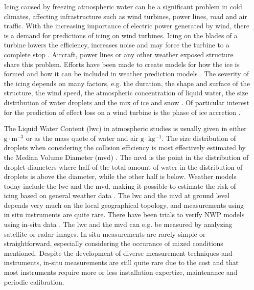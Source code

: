 Icing caused by freezing atmospheric water can be a significant problem in cold climates, affecting infrastructure such as wind turbines, power lines, road and air traffic. With the increasing importance of electric power generated by wind, there is a demand for predictions of icing on wind turbines. Icing on the blades of a turbine lowers the efficiency, increases noise and may force the turbine to a complete stop \cite{dalili2009,cost727,homo2012,jasin1998}. Aircraft, power lines or any other weather exposed structure share this problem. Efforts have been made to create models for how the ice is formed \cite{makk2000,makk2001,shin1992} and how it can be included in weather prediction models \cite{thomp2009,kring2011}. The severity of the icing depends on many factors, e.g. the duration, the shape and surface of the structure, the wind speed, the atmospheric concentration of liquid water, the size distribution of water droplets and the mix of ice and snow \cite{kring2011,makk2000,makk2001,homo2010,han2012}. Of particular interest for the prediction of effect loss on a wind turbine is the phase of ice accretion \cite{davis2014}.

The Liquid Water Content (\gls{lwc}) in atmospheric studies is usually given in either $\mathrm{g\cdot m^{-3}}$ \cite{sein1998} or as the mass quote of water and air $\mathrm{g\cdot kg^{-1}}$. The size distribution of droplets when considering the collision efficiency is most effectively estimated by the Median Volume Diameter (\gls{mvd}) \cite{fins1988}. The \gls{mvd} is the point in the distribution of droplet diameters where half of the total amount of water in the distribution of droplets is above the diameter, while the other half is below. Weather models today include the \gls{lwc} and the \gls{mvd}, making it possible to estimate the risk of icing based on general weather data \cite{thomp2009}. The \gls{lwc} and the \gls{mvd} at ground level depends very much on the local geographical topology, and measurements using in situ instruments are quite rare. There have been trials to verify NWP models using in-situ data \cite{berg2013}. The \gls{lwc} and the \gls{mvd} can e.g. be measured by analyzing satellite or radar images. In-situ measurements are rarely simple or straightforward, especially considering the occurance of mixed conditions mentioned. Despite the development of diverse measurement techniques and instruments, in-situ measurements are still quite rare due to the cost and that most instruments require more or less installation expertize, maintenance and periodic calibration.

